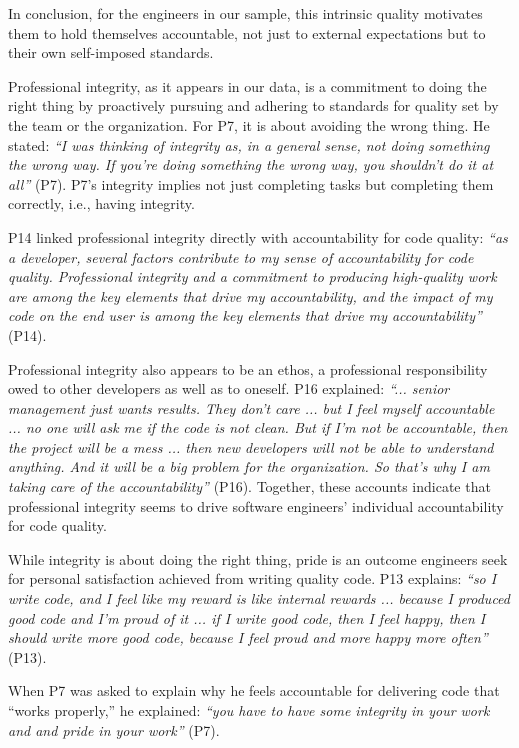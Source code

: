 In conclusion, for the engineers in our sample, this intrinsic quality motivates them to hold themselves accountable, not just to external expectations but to their own self-imposed standards.

 Professional integrity, as it appears in our data, is a commitment to doing the right thing by proactively pursuing and adhering to standards for quality set by the team or the organization. For P7, it is about avoiding the wrong thing. He stated: \emph{``I was thinking of integrity as, in a general sense, not doing something the wrong way. If you're doing something the wrong way, you shouldn't do it at all''} (P7). P7's integrity implies not just completing tasks but completing them correctly, i.e., having integrity. 

P14 linked professional integrity directly with accountability for code quality: \emph{``as a developer, several factors contribute to my sense of accountability for code quality. Professional integrity and a commitment to producing high-quality work are among the key elements that drive my accountability, and the impact of my code on the end user is among the key elements that drive my accountability''} (P14).

Professional integrity also appears to be an ethos, a professional responsibility owed to other developers as well as to oneself. P16 explained: \emph{``... senior management just wants results. They don't care ... but I feel myself accountable ... no one will ask me if the code is not clean. But if I'm not be accountable, then the project will be a mess ... then new developers will not be able to understand anything. And it will be a big problem for the organization. So that's why I am taking care of the accountability''} (P16). Together, these accounts indicate that professional integrity seems to drive software engineers' individual accountability for code quality.

 While integrity is about doing the right thing, pride is an outcome engineers seek for personal satisfaction achieved from writing quality code. P13 explains: \emph{``so I write code, and I feel like my reward is like internal rewards ... because I produced good code and I'm proud of it ...  if I write good code, then I feel happy, then I should write more good code, because I feel proud and more happy more often''} (P13).

When P7 was asked to explain why he feels accountable for delivering code that ``works properly,'' he explained: \emph{``you have to have some integrity in your work and and pride in your work''} (P7).

